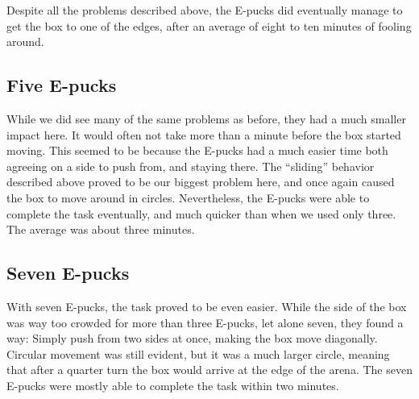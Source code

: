 \documentclass[a4paper,12pt]{article}
\begin{document}
Despite all the problems described above, the E-pucks did eventually manage to get the box to one of the edges, after an average of eight to ten minutes of fooling around.

\subsection{Five E-pucks}
While we did see many of the same problems as before, they had a much smaller impact here. It would often not take more than a minute before the box started moving. This seemed to be because the E-pucks had a much easier time both agreeing on a side to push from, and staying there. The ``sliding'' behavior described above proved to be our biggest problem here, and once again caused the box to move around in circles. Nevertheless, the E-pucks were able to complete the task eventually, and much quicker than when we used only three. The average was about three minutes.

\subsection{Seven E-pucks}
With seven E-pucks, the task proved to be even easier. While the side of the box was way too crowded for more than three E-pucks, let alone seven, they found a way: Simply push from two sides at once, making the box move diagonally. Circular movement was still evident, but it was a much larger circle, meaning that after a quarter turn the box would arrive at the edge of the arena. The seven E-pucks were mostly able to complete the task within two minutes.
\end{document}
